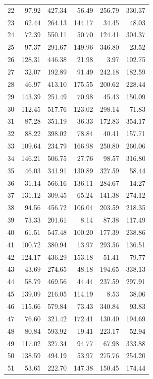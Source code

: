 \begin{longtable}{rrrrrr}
22 & 97.92 & 427.34 & 56.49 & 256.79 & 330.37 \\
23 & 62.44 & 264.13 & 144.17 & 34.45 & 48.03 \\
24 & 72.39 & 550.11 & 50.70 & 124.41 & 304.37 \\
25 & 97.37 & 291.67 & 149.96 & 346.80 & 23.52 \\
26 & 128.31 & 446.38 & 21.98 & 3.97 & 102.75 \\
27 & 32.07 & 192.89 & 91.49 & 242.18 & 182.59 \\
28 & 46.97 & 413.10 & 175.55 & 200.62 & 228.44 \\
29 & 143.39 & 251.49 & 70.98 & 45.43 & 150.09 \\
30 & 112.45 & 517.76 & 123.02 & 298.14 & 71.83 \\
31 & 87.28 & 351.19 & 36.33 & 172.83 & 354.17 \\
32 & 88.22 & 398.02 & 78.84 & 40.41 & 157.71 \\
33 & 109.64 & 234.79 & 166.98 & 250.80 & 260.06 \\
34 & 146.21 & 506.75 & 27.76 & 98.57 & 316.80 \\
35 & 46.03 & 341.91 & 130.89 & 327.59 & 58.44 \\
36 & 31.14 & 566.16 & 136.11 & 284.67 & 14.27 \\
37 & 131.12 & 309.45 & 65.24 & 141.38 & 274.12 \\
38 & 94.56 & 456.72 & 106.04 & 203.59 & 218.35 \\
39 & 73.33 & 201.61 & 8.14 & 87.38 & 117.49 \\
40 & 61.51 & 547.48 & 100.20 & 177.39 & 238.86 \\
41 & 100.72 & 380.94 & 13.97 & 293.56 & 136.51 \\
42 & 124.17 & 436.29 & 153.18 & 51.41 & 79.77 \\
43 & 43.69 & 274.65 & 48.18 & 194.65 & 338.13 \\
44 & 58.79 & 469.56 & 44.44 & 237.59 & 297.91 \\
45 & 139.09 & 216.05 & 114.19 & 8.53 & 38.06 \\
46 & 115.66 & 579.84 & 73.43 & 340.84 & 93.83 \\
47 & 76.60 & 321.42 & 172.41 & 130.40 & 194.69 \\
48 & 80.84 & 593.92 & 19.41 & 223.17 & 52.94 \\
49 & 117.02 & 327.34 & 94.77 & 67.98 & 333.88 \\
50 & 138.59 & 494.19 & 53.97 & 275.76 & 254.20 \\
51 & 53.65 & 222.70 & 147.38 & 150.45 & 174.44 \\

\end{longtable}
